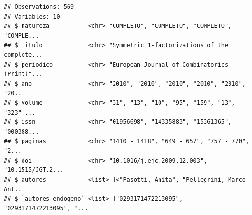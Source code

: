 \documentclass[]{article}
\newenvironment{Shaded}{\begin{snugshade}}{\end{snugshade}}
\newcommand{\KeywordTok}[1]{\textcolor[rgb]{0.13,0.29,0.53}{\textbf{#1}}}
\newcommand{\DataTypeTok}[1]{\textcolor[rgb]{0.13,0.29,0.53}{#1}}
\newcommand{\CharTok}[1]{\textcolor[rgb]{0.31,0.60,0.02}{#1}}
\newcommand{\StringTok}[1]{\textcolor[rgb]{0.31,0.60,0.02}{#1}}
\newcommand{\CommentTok}[1]{\textcolor[rgb]{0.56,0.35,0.01}{\textit{#1}}}
\newcommand{\OperatorTok}[1]{\textcolor[rgb]{0.81,0.36,0.00}{\textbf{#1}}}
\newcommand{\NormalTok}[1]{#1}
\begin{document}
\begin{verbatim}
## Observations: 569
## Variables: 10
## $ natureza           <chr> "COMPLETO", "COMPLETO", "COMPLETO", "COMPLE...
## $ titulo             <chr> "Symmetric 1-factorizations of the complete...
## $ periodico          <chr> "European Journal of Combinatorics (Print)"...
## $ ano                <chr> "2010", "2010", "2010", "2010", "2010", "20...
## $ volume             <chr> "31", "13", "10", "95", "159", "13", "323",...
## $ issn               <chr> "01956698", "14335883", "15361365", "000388...
## $ paginas            <chr> "1410 - 1418", "649 - 657", "757 - 770", "2...
## $ doi                <chr> "10.1016/j.ejc.2009.12.003", "10.1515/JGT.2...
## $ autores            <list> [<"Pasotti, Anita", "Pellegrini, Marco Ant...
## $ `autores-endogeno` <list> ["0293171472213095", "0293171472213095", "...
\end{verbatim}

\begin{Shaded}
\end{Shaded}
\end{document}
